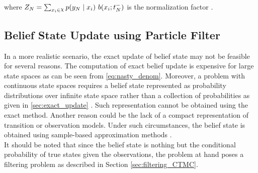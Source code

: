 where $ Z_{N} = \sum_{x_{i}\in \rchi} p(y_{N} \mid x_{i})\ b(x_{i}; t_{N}^{-}) $ is the normalization factor \cite{article}.

\subsection{Belief State Update using Particle Filter}
\label{sec:particle_filter}
In a more realistic scenario, the exact update of belief state may not be feasible for several reasons. The computation of exact belief update is expensive for large state spaces as can be seen from \autoref{eq:nasty_denom}. Moreover, a problem with continuous state spaces requires a belief state represented as probability distributions over infinite state space rather than a collection of probabilities as given in \cref{sec:exact_update} \cite{Carlo1904}. Such representation cannot be obtained using the exact method. Another reason could be the lack of a compact representation of transition or observation models. Under such circumstances, the belief state is obtained using sample-based approximation methods \cite{Carlo1904}. \\
It should be noted that since the belief state is nothing but the conditional probability of true states given the observations, the problem at hand poses a filtering problem as described in Section \ref{sec:filtering_CTMC}.

